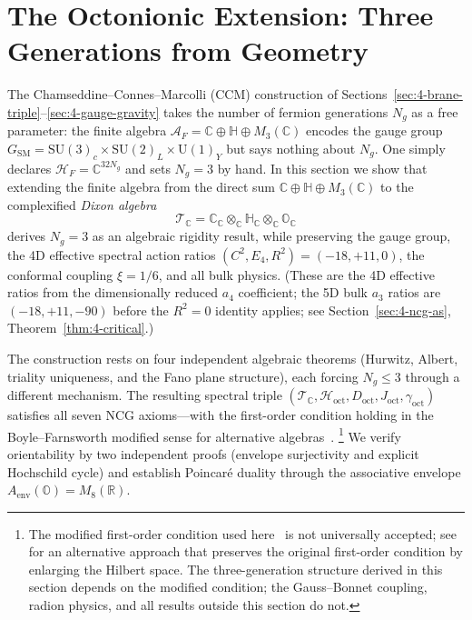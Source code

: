 \section{The Octonionic Extension: Three Generations from Geometry}
\label{sec:4-octonionic}

The Chamseddine--Connes--Marcolli (CCM) construction of Sections~\ref{sec:4-brane-triple}--\ref{sec:4-gauge-gravity} takes the number of fermion generations $N_g$ as a free parameter: the finite algebra $\mathcal{A}_F = \mathbb{C} \oplus \mathbb{H} \oplus M_3(\mathbb{C})$ encodes the gauge group $G_{\mathrm{SM}} = \mathrm{SU}(3)_c \times \mathrm{SU}(2)_L \times \mathrm{U}(1)_Y$ but says nothing about $N_g$. One simply declares $\mathcal{H}_F = \mathbb{C}^{32 N_g}$ and sets $N_g = 3$ by hand. In this section we show that extending the finite algebra from the direct sum $\mathbb{C} \oplus \mathbb{H} \oplus M_3(\mathbb{C})$ to the complexified \emph{Dixon algebra}
\begin{equation}
  \mathcal{T}_{\mathbb{C}} = \mathbb{C}_{\mathbb{C}} \otimes_{\mathbb{C}} \mathbb{H}_{\mathbb{C}} \otimes_{\mathbb{C}} \mathbb{O}_{\mathbb{C}}
  \label{eq:4-74}
\end{equation}
derives $N_g = 3$ as an algebraic rigidity result, while preserving the gauge group, the 4D effective spectral action ratios $(C^2, E_4, R^2) = (-18, +11, 0)$, the conformal coupling $\xi = 1/6$, and all bulk physics. (These are the 4D effective ratios from the dimensionally reduced $a_4$ coefficient; the 5D bulk $a_3$ ratios are $(-18, +11, -90)$ before the $R^2 = 0$ identity applies; see Section~\ref{sec:4-ncg-as}, Theorem~\ref{thm:4-critical}.)

The construction rests on four independent algebraic theorems (Hurwitz, Albert, triality uniqueness, and the Fano plane structure), each forcing $N_g \leq 3$ through a different mechanism. The resulting spectral triple $(\mathcal{T}_{\mathbb{C}}, \mathcal{H}_{\mathrm{oct}}, D_{\mathrm{oct}}, J_{\mathrm{oct}}, \gamma_{\mathrm{oct}})$ satisfies all seven NCG axioms---with the first-order condition holding in the Boyle--Farnsworth modified sense for alternative algebras~\cite{ch4:BoyleFarnsworth2020}.%
\footnote{The modified first-order condition used here~\cite{ch4:BoyleFarnsworth2020,ch4:ChamseddineConnesSuijlekom2013} is not universally accepted; see~\cite{ch4:Devastato2018} for an alternative approach that preserves the original first-order condition by enlarging the Hilbert space. The three-generation structure derived in this section depends on the modified condition; the Gauss--Bonnet coupling, radion physics, and all results outside this section do not.} We verify orientability by two independent proofs (envelope surjectivity and explicit Hochschild cycle) and establish Poincar\'{e} duality through the associative envelope $A_{\mathrm{env}}(\mathbb{O}) = M_8(\mathbb{R})$.

